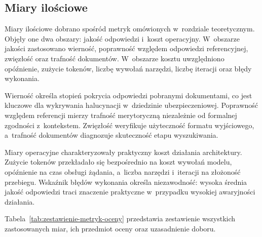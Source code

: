 \subsection{Miary ilościowe}\label{subsec:miary-ilosciowe}

Miary ilościowe dobrano spośród metryk omówionych w~rozdziale teoretycznym.
Objęły one dwa obszary: jakość odpowiedzi i~koszt operacyjny. W~obszarze
jakości zastosowano wierność, poprawność względem odpowiedzi referencyjnej,
zwięzłość oraz trafność dokumentów. W~obszarze kosztu uwzględniono opóźnienie,
zużycie tokenów, liczbę wywołań narzędzi, liczbę iteracji oraz błędy wykonania.

Wierność określa stopień pokrycia odpowiedzi pobranymi dokumentami, co jest
kluczowe dla wykrywania halucynacji w~dziedzinie ubezpieczeniowej. Poprawność
względem referencji mierzy trafność merytoryczną niezależnie od formalnej
zgodności z~kontekstem. Zwięzłość weryfikuje użyteczność formatu wyjściowego,
a~trafność dokumentów diagnozuje skuteczność etapu wyszukiwania.

Miary operacyjne charakteryzowały praktyczny koszt działania architektury.
Zużycie tokenów przekładało się bezpośrednio na koszt wywołań modelu,
opóźnienie na czas obsługi żądania, a~liczba narzędzi i~iteracji na złożoność
przebiegu. Wskaźnik błędów wykonania określa niezawodność: wysoka średnia
jakość odpowiedzi traci znaczenie praktyczne w~przypadku wysokiej awaryjności
działania.

Tabela~\ref{tab:zestawienie-metryk-oceny} przedstawia zestawienie wszystkich
zastosowanych miar, ich przedmiot oceny oraz uzasadnienie doboru.

